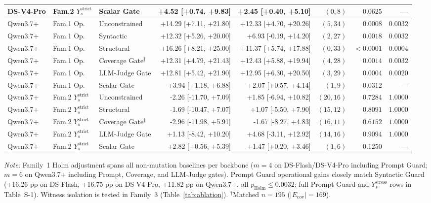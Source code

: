 \begin{table}[t]
\begin{tabular}{lllrrrrr}
DS-V4-Pro & Fam.2 $Y_s^{\text{strict}}$ & Scalar Gate & +4.52 [+0.74, +9.83] & +2.45 [+0.40, +5.10] & $(0,8)$ & $0.0625$ & --- \\
\midrule
Qwen3.7+ & Fam.1 Op. & Unconstrained & +14.29 [+7.11, +21.80] & +12.33 [+4.70, +20.26] & $(5,34)$ & $0.0008$ & $0.0032$ \\
Qwen3.7+ & Fam.1 Op. & Syntactic & +12.32 [+5.26, +20.00] & +6.93 [-0.19, +14.20] & $(2,27)$ & $0.0018$ & $0.0032$ \\
Qwen3.7+ & Fam.1 Op. & Structural & +16.26 [+8.21, +25.00] & +11.37 [+5.74, +17.88] & $(0,33)$ & $<0.0001$ & $0.0004$ \\
Qwen3.7+ & Fam.1 Op. & Coverage Gate$^{\dagger}$ & +12.31 [+4.79, +21.43] & +12.43 [+5.88, +19.94] & $(4,28)$ & $0.0014$ & $0.0032$ \\
Qwen3.7+ & Fam.1 Op. & LLM-Judge Gate & +12.81 [+5.42, +21.90] & +12.95 [+6.30, +20.50] & $(3,29)$ & $0.0004$ & $0.0020$ \\
Qwen3.7+ & Fam.1 Op. & Scalar Gate & +3.94 [+1.18, +6.88] & +2.07 [+0.57, +4.14] & $(1,9)$ & $0.0312$ & --- \\
Qwen3.7+ & Fam.2 $Y_s^{\text{strict}}$ & Unconstrained & -2.26 [-11.70, +7.09] & +1.85 [-6.94, +10.82] & $(20,16)$ & $0.7284$ & $1.0000$ \\
Qwen3.7+ & Fam.2 $Y_s^{\text{strict}}$ & Structural & -1.69 [-10.47, +7.07] & +1.07 [-5.50, +7.90] & $(15,12)$ & $0.8091$ & $1.0000$ \\
Qwen3.7+ & Fam.2 $Y_s^{\text{strict}}$ & Coverage Gate$^{\dagger}$ & -2.96 [-11.98, +5.91] & -1.67 [-8.27, +4.83] & $(16,11)$ & $0.6152$ & $1.0000$ \\
Qwen3.7+ & Fam.2 $Y_s^{\text{strict}}$ & LLM-Judge Gate & +1.13 [-8.42, +10.20] & +4.68 [-3.11, +12.92] & $(14,16)$ & $0.9094$ & $1.0000$ \\
Qwen3.7+ & Fam.2 $Y_s^{\text{strict}}$ & Scalar Gate & +2.82 [+0.56, +5.39] & +1.47 [+0.20, +3.46] & $(1,6)$ & $0.1250$ & --- \\
\bottomrule
\end{tabular}
\par\smallskip\parbox{0.97\textwidth}{\scriptsize\textit{Note:} Family~1 Holm adjustment spans all non-mutation baselines per backbone ($m=4$ on DS-Flash/DS-V4-Pro including Prompt Guard; $m=6$ on Qwen3.7+ including Prompt, Coverage, and LLM-Judge gates). Prompt Guard operational gains closely match Syntactic Guard (+16.26 pp on DS-Flash, +16.75 pp on DS-V4-Pro, +11.82 pp on Qwen3.7+, all $p_{\text{Holm}} \le 0.0032$; full Prompt Guard and $Y_s^{\text{stress}}$ rows in Table~S-1). Witness isolation is tested in Family~3 (Table~\ref{tab:ablation}). $^{\dagger}$Matched $n=195$ ($|E_{\text{cov}}|=169$).}
\end{table}
